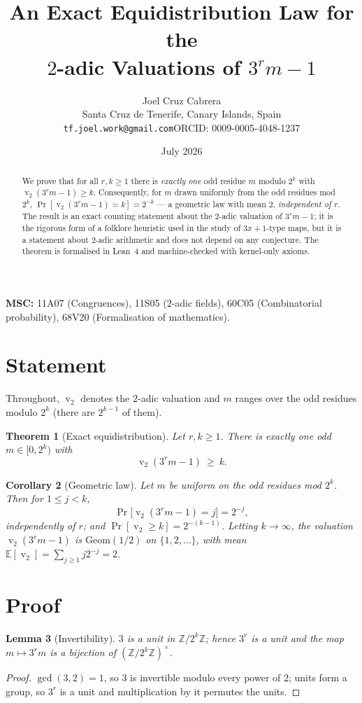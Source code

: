 \documentclass[11pt,a4paper]{article}
\title{\bfseries An Exact Equidistribution Law for the\\ $2$-adic Valuations of $3^{r}m-1$}
\author{Joel Cruz Cabrera\\
\small Santa Cruz de Tenerife, Canary Islands, Spain\\
\small\texttt{tf.joel.work@gmail.com}\quad ORCID: 0009-0005-4048-1237}
\date{July 2026}
\theoremstyle{plain}
\newtheorem{theorem}{Theorem}[section]
\newtheorem{lemma}[theorem]{Lemma}
\newtheorem{corollary}[theorem]{Corollary}
\theoremstyle{definition}
\newcommand{\val}{\operatorname{v}_2}
\begin{document}
\maketitle

\begin{abstract}
We prove that for all $r,k\ge1$ there is \emph{exactly one} odd residue $m$ modulo $2^k$ with
$\val(3^{r}m-1)\ge k$. Consequently, for $m$ drawn uniformly from the odd residues mod $2^k$,
$\Pr[\val(3^{r}m-1)=k]=2^{-k}$ --- a geometric law with mean $2$, \emph{independent of $r$}.
The result is an exact counting statement about the $2$-adic valuation of $3^rm-1$; it is the
rigorous form of a folklore heuristic used in the study of $3x+1$-type maps, but it is a
statement about $2$-adic arithmetic and does not depend on any conjecture. The theorem is
formalised in Lean~4 and machine-checked with kernel-only axioms.
\end{abstract}

\noindent\textbf{MSC:} 11A07 (Congruences), 11S05 ($2$-adic fields), 60C05 (Combinatorial
probability), 68V20 (Formalisation of mathematics).

\section{Statement}
Throughout, $\val$ denotes the $2$-adic valuation and $m$ ranges over the odd residues modulo
$2^k$ (there are $2^{k-1}$ of them).

\begin{theorem}[Exact equidistribution]\label{thm:main}
Let $r,k\ge1$. There is exactly one odd $m\in[0,2^{k})$ with
\[
  \val(3^{r}m-1)\ \ge\ k .
\]
\end{theorem}

\begin{corollary}[Geometric law]\label{cor:geom}
Let $m$ be uniform on the odd residues mod $2^{k}$. Then for $1\le j<k$,
\[
  \Pr\bigl[\val(3^{r}m-1)=j\bigr]=2^{-j},
\]
independently of $r$; and $\Pr[\val\ge k]=2^{-(k-1)}$. Letting $k\to\infty$, the valuation
$\val(3^rm-1)$ is $\mathrm{Geom}(1/2)$ on $\{1,2,\dots\}$, with mean
$\mathbb{E}[\val]=\sum_{j\ge1}j2^{-j}=2$.
\end{corollary}

\section{Proof}
\begin{lemma}[Invertibility]\label{lem:inv}
$3$ is a unit in $\mathbb{Z}/2^{k}\mathbb{Z}$; hence $3^{r}$ is a unit and the map
$m\mapsto 3^{r}m$ is a bijection of $(\mathbb{Z}/2^{k}\mathbb{Z})^{\times}$.
\end{lemma}
\begin{proof}
$\gcd(3,2)=1$, so $3$ is invertible modulo every power of $2$; units form a group, so $3^{r}$
is a unit and multiplication by it permutes the units.
\end{proof}
\end{document}
